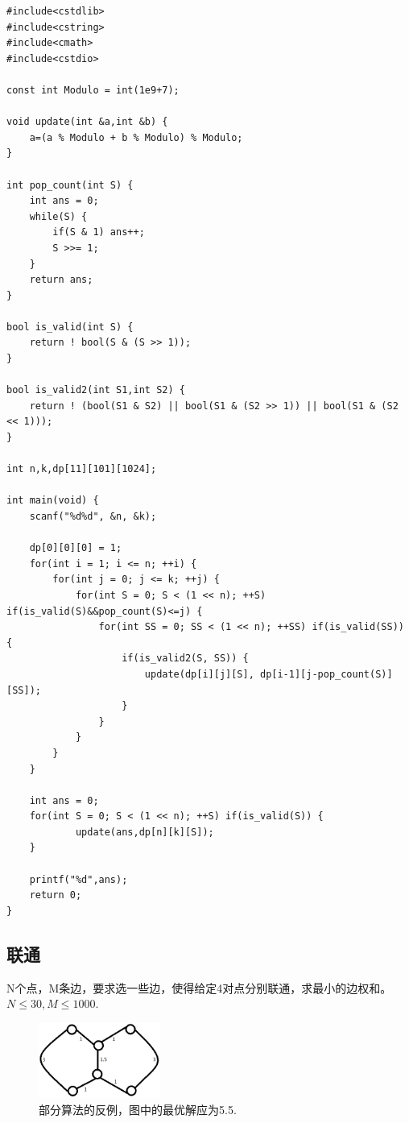 \begin{verbatim}
#include<cstdlib>
#include<cstring>
#include<cmath>
#include<cstdio>

const int Modulo = int(1e9+7);

void update(int &a,int &b) {
    a=(a % Modulo + b % Modulo) % Modulo;
}

int pop_count(int S) {
    int ans = 0;
    while(S) {
        if(S & 1) ans++;
        S >>= 1;
    }
    return ans;
}

bool is_valid(int S) {
    return ! bool(S & (S >> 1));
}

bool is_valid2(int S1,int S2) {
    return ! (bool(S1 & S2) || bool(S1 & (S2 >> 1)) || bool(S1 & (S2 << 1)));
}

int n,k,dp[11][101][1024];

int main(void) {
    scanf("%d%d", &n, &k);

    dp[0][0][0] = 1;
    for(int i = 1; i <= n; ++i) {
        for(int j = 0; j <= k; ++j) {
            for(int S = 0; S < (1 << n); ++S) if(is_valid(S)&&pop_count(S)<=j) {
                for(int SS = 0; SS < (1 << n); ++SS) if(is_valid(SS)) {
                    if(is_valid2(S, SS)) {
                        update(dp[i][j][S], dp[i-1][j-pop_count(S)][SS]);
                    }
                }
            }
        }
    }

    int ans = 0;
    for(int S = 0; S < (1 << n); ++S) if(is_valid(S)) {
            update(ans,dp[n][k][S]);
    }

    printf("%d",ans);
    return 0;
}
\end{verbatim}

\subsection{联通}
N个点，M条边，要求选一些边，使得给定4对点分别联通，求最小的边权和。$N\le 30, M\le 1000.$
\begin{figure}[h]
    \begin{center}
        \includegraphics[width=4cm]{oppsite.png}
    \end{center}
    \caption{部分算法的反例，图中的最优解应为5.5.}
    \label{fig. 1.2}
\end{figure}

